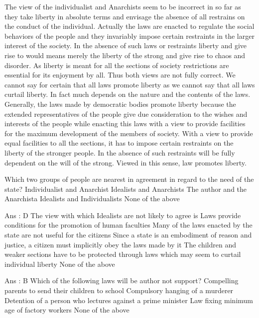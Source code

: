     The view of the individualist and Anarchists seem to be incorrect in so far as they take liberty in absolute terms and envisage the absence of all restrains on the conduct of the individual. Actually the laws are enacted to regulate the social behaviors of the people and they invariably impose certain restraints in the larger interest of the society. In the absence of such laws or restraints liberty and give rise to would means merely the liberty of the strong and give rise to chaos and disorder. As liberty is meant for all the sections of society restrictions are essential for its enjoyment by all. Thus both views are not fully correct. We cannot say for certain that all laws promote liberty as we cannot say that all laws curtail liberty. In fact much depends on the nature and the contents of the laws. Generally, the laws made by democratic bodies promote liberty because the extended representatives of the people give due consideration to the wishes and interests of the people while enacting this laws with a view to provide facilities for the maximum development of the members of society. With a view to provide equal facilities to all the sections, it has to impose certain restraints on the liberty of the stronger people. In the absence of such restraints will be fully dependent on the will of the strong. Viewed in this sense, law promotes liberty.

        Which two groups of people are nearest in agreement in regard to the need of the state?
            Individualist and Anarchist
            Idealists and Anarchists
            The author and the Anarchista
            Idealists and Individualists
            None of the above 

        Ans : D
        The view with which Idealists are not likely to agree is
            Laws provide conditions for the promotion of human faculties
            Many of the laws enacted by the state are not useful for the citizens
            Since a state is an embodiment of reason and justice, a citizen must implicitly obey the laws made by it
            The children and weaker sections have to be protected through laws which may seem to curtail individual liberty
            None of the above 

        Ans : B
        Which of the following laws will be author not support?
            Compelling parents to send their children to school
            Compulsory hanging of a murderer
            Detention of a person who lectures against a prime minister
            Law fixing minimum age of factory workers
            None of the above 

